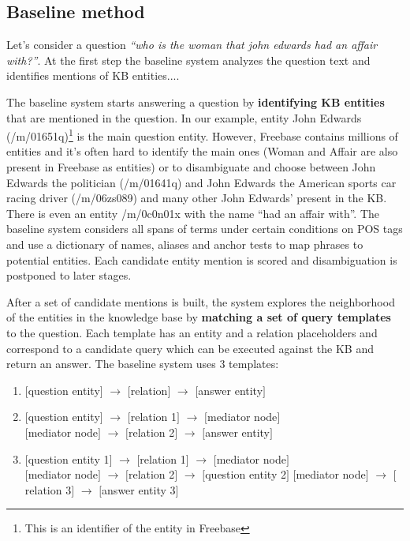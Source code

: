 \subsection{Baseline method}

Let's consider a question \textit{``who is the woman that john edwards had an affair with?''}.
At the first step the baseline system analyzes the question text and identifies mentions of KB entities....

The baseline system starts answering a question by \textbf{identifying KB entities} that are mentioned in the question.
In our example, entity John Edwards (/m/01651q)\footnote{This is an identifier of the entity in Freebase} is the main question entity.
However, Freebase contains millions of entities and it's often hard to identify the main ones (\eg Woman and Affair are also present in Freebase as entities) or to disambiguate and choose between John Edwards the politician (/m/01641q) and John Edwards the American sports car racing driver (/m/06zs089) and many other John Edwards' present in the KB.
There is even an entity /m/0c0n01x with the name ``had an affair with''.
The baseline system considers all spans of terms under certain conditions on POS tags and use a dictionary of names, aliases and anchor tests \cite{SPITKOVSKY12.266} to map phrases to potential entities.
Each candidate entity mention is scored and disambiguation is postponed to later stages.

After a set of candidate mentions is built, the system explores the neighborhood of the entities in the knowledge base by \textbf{matching a set of query templates} to the question.
Each template has an entity and a relation placeholders and correspond to a candidate query which can be executed against the KB and return an answer.
The baseline system uses 3 templates:
\begin{enumerate}
\item $[$question entity$]$ $\rightarrow$ $[$relation$]$ $\rightarrow$ $[$answer entity$]$
\item $[$question entity$]$ $\rightarrow$ $[$relation 1$]$ $\rightarrow$ $[$mediator node$]$\\
$[$mediator node$]$ $\rightarrow$ $[$relation 2$]$ $\rightarrow$ $[$answer entity$]$
\item $[$question entity 1$]$ $\rightarrow$ $[$relation 1$]$ $\rightarrow$ $[$mediator node$]$\\
$[$mediator node$]$ $\rightarrow$ $[$relation 2$]$ $\rightarrow$ $[$question entity 2$]$
$[$mediator node$]$ $\rightarrow$ $[$relation 3$]$ $\rightarrow$ $[$answer entity 3$]$
\end{enumerate}

